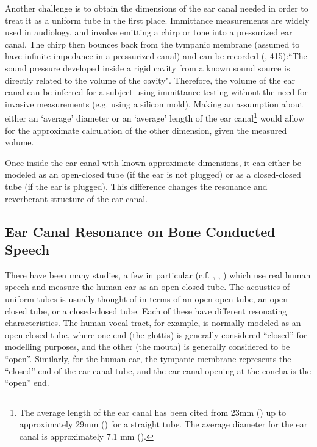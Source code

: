 \documentclass[dissertation,copyright]{uathesis}
\begin{document}
Another challenge is to obtain the dimensions of the ear canal needed in order to treat it as a uniform tube in the first place. Immittance measurements are widely used in audiology, and involve emitting a chirp or tone into a pressurized ear canal.  The chirp then bounces back from the tympanic membrane (assumed to have infinite impedance in a pressurized canal) and can be recorded (\cite{ballachanda:97}, 415):``The sound pressure developed inside a rigid cavity from a known sound source is directly related to the volume of the cavity".  Therefore, the volume of the ear canal can be inferred for a subject using immittance testing without the need for invasive measurements (e.g. using a silicon mold).  Making an assumption about either an `average' diameter or an `average' length of the ear canal\footnote{The average length of the ear canal has been cited from 23mm (\cite{rosen:91}) up to approximately 29mm (\cite{stinson:89}) for a straight tube. The average diameter for the ear canal is approximately 7.1 mm (\cite{salvinelli:91}).}  would allow for the approximate calculation of the other dimension, given the measured volume. 


Once inside the ear canal with known approximate dimensions, it can either be modeled as an open-closed tube (if the ear is not plugged) or as a closed-closed tube (if the ear is plugged). This difference changes the resonance and reverberant structure of the ear canal.

\subsection{Ear Canal Resonance on Bone Conducted Speech}

There have been many studies, a few in particular (c.f. \cite{bekesy:48}, \cite{porschmann:00}, \cite{reinfeldt:10}) which use real human speech and measure the human ear as an open-closed tube.
%
The acoustics of uniform tubes is usually thought of in terms of an open-open tube, an open-closed tube, or a closed-closed tube.  Each of these have different resonating characteristics. The human vocal tract, for example, is normally modeled as an open-closed tube, where one end (the glottis) is generally considered ``closed'' for modelling purposes, and the other (the mouth) is generally considered to be ``open''.  Similarly, for the human ear, the tympanic membrane represents the ``closed'' end of the ear canal tube, and the ear canal opening at the concha is the ``open'' end.
\end{document}
